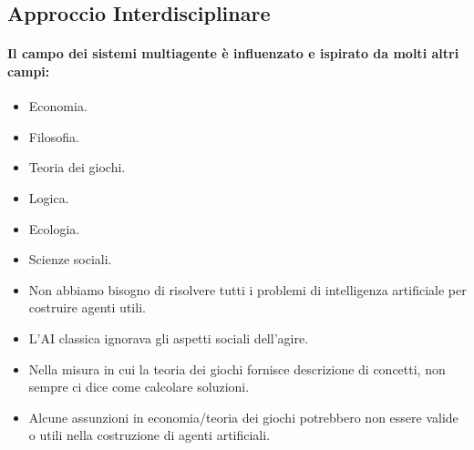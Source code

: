 
\subsection{Approccio Interdisciplinare}

\paragraph{Il campo dei sistemi multiagente è influenzato e ispirato da molti altri campi:}

\begin{itemize}
  \item Economia. 
  \item Filosofia. 
  \item Teoria dei giochi. 
  \item Logica. 
  \item Ecologia. 
  \item Scienze sociali.
\end{itemize}



\begin{itemize}
  \item Non abbiamo bisogno di risolvere tutti i problemi di intelligenza artificiale per costruire agenti utili. 
  \item L'AI classica ignorava gli aspetti sociali dell'agire.
\end{itemize}


\begin{itemize}
  \item Nella misura in cui la teoria dei giochi fornisce descrizione di concetti, non sempre ci dice come calcolare soluzioni. 
  \item Alcune assunzioni in economia/teoria dei giochi potrebbero non essere valide o utili nella costruzione di agenti artificiali.
\end{itemize}


